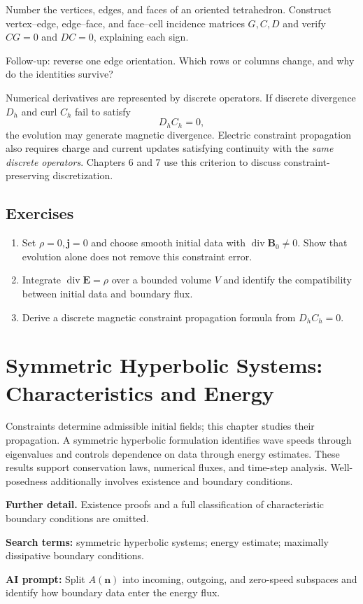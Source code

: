 \documentclass[11pt,openany]{book}
\numberwithin{equation}{chapter}
\theoremstyle{definition}
\theoremstyle{remark}
\newcommand{\Div}{\operatorname{div}}
\newcommand{\studyroute}[3]{%
  \par\smallskip\noindent\textbf{Further detail.} #1\par
  \begingroup\raggedright\noindent\textbf{Search terms:} #2.\par\endgroup
  \noindent\textbf{AI prompt:} #3\par
}
\begin{document}
\begin{askai}
Number the vertices, edges, and faces of an oriented tetrahedron. Construct vertex--edge, edge--face, and face--cell incidence matrices $G,C,D$ and verify $CG=0$ and $DC=0$, explaining each sign.

Follow-up: reverse one edge orientation. Which rows or columns change, and why do the identities survive?
\end{askai}
Numerical derivatives are represented by discrete operators. If discrete divergence $D_h$ and curl $C_h$ fail to satisfy
\begin{equation}\label{eq:discretecomplex}
D_hC_h=0,
\end{equation}
the evolution may generate magnetic divergence. Electric constraint propagation also requires charge and current updates satisfying continuity with the \emph{same discrete operators}. Chapters 6 and 7 use this criterion to discuss constraint-preserving discretization.

\section{Exercises}
\begin{enumerate}
\item Set $\rho=0,\bm j=0$ and choose smooth initial data with $\Div\bm B_0\neq0$. Show that evolution alone does not remove this constraint error.
\item Integrate $\Div\bm E=\rho$ over a bounded volume $V$ and identify the compatibility between initial data and boundary flux.
\item Derive a discrete magnetic constraint propagation formula from $D_hC_h=0$.
\end{enumerate}

\chapter{Symmetric Hyperbolic Systems: Characteristics and Energy}
\label{ch:hyperbolic}
\begin{chaptersummary}
Constraints determine admissible initial fields; this chapter studies their propagation. A symmetric hyperbolic formulation identifies wave speeds through eigenvalues and controls dependence on data through energy estimates. These results support conservation laws, numerical fluxes, and time-step analysis. Well-posedness additionally involves existence and boundary conditions.
\end{chaptersummary}
\studyroute{Existence proofs and a full classification of characteristic boundary conditions are omitted.}{symmetric hyperbolic systems; energy estimate; maximally dissipative boundary conditions}{Split $A(\bm n)$ into incoming, outgoing, and zero-speed subspaces and identify how boundary data enter the energy flux.}
\end{document}

